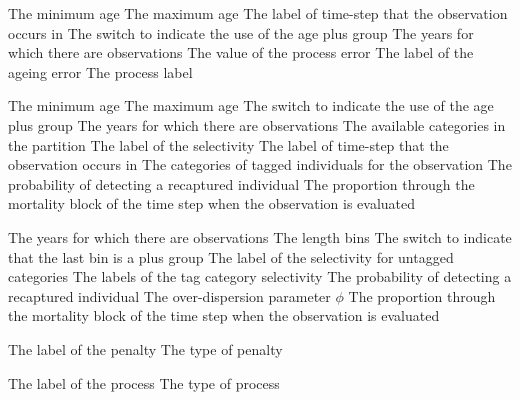 \par\textbf{}\par
{} {The minimum age}
 {The maximum age}
 {The label of time-step that the observation occurs in}
 {The switch to indicate the use of the age plus group}
 {The years for which there are observations}
 {The value of the process error}
 {The label of the ageing error}
 {The process label}

\par\textbf{}\par
{} {The minimum age}
 {The maximum age}
 {The switch to indicate the use of the age plus group}
 {The years for which there are observations}
 {The available categories in the partition}
 {The label of the selectivity}
 {The label of time-step that the observation occurs in}
 {The categories of tagged individuals for the observation}
 {The probability of detecting a recaptured individual}
 {The proportion through the mortality block of the time step when the observation is evaluated}

\par\textbf{}\par
{} {The years for which there are observations}
 {The length bins}
 {The switch to indicate that the last bin is a plus group}
 {The label of the selectivity for untagged categories}
 {The labels of the tag category selectivity}
 {The probability of detecting a recaptured individual}
 {The over-dispersion parameter $\phi$}
 {The proportion through the mortality block of the time step when the observation is evaluated}

\par\par
{} {The label of the penalty}
 {The type of penalty}

\par\par
{} {The label of the process}
 {The type of process}

